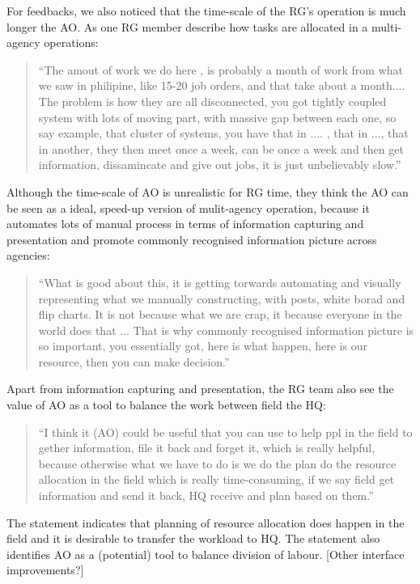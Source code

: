 For feedbacks, we also noticed that the time-scale of the RG's operation is much longer the AO. As one RG member describe how tasks are allocated in a multi-agency operations: 

\begin{quotation}
``The amout of work we do here , is probably a month of work from what we saw in philipine, like 15-20 job orders, and that take about a month.... The problem is how they are all disconnected, you got tightly coupled system with lots of moving part, with massive gap between each one, so say example, that cluster of systems, you have that in .... , that in ..., that in another, they then meet once a week, can be once a week and then get information, dissamincate and give out jobs, it is just unbelievably slow.''
\end{quotation}

Although the time-scale of AO is unrealistic for RG time,  they think the AO can be seen as a ideal, speed-up version of mulit-agency operation, because it automates lots of manual process in terms of information capturing and presentation and promote commonly recognised information picture across agencies:

\begin{quotation}
``What is good about this, it is getting torwards automating and visually representing what we manually constructing, with posts, white borad and flip charts. It is not because what we are crap, it because everyone in the world does that ...  That is why commonly recognised information picture is so important, you essentially got, here is what happen, here is our resource, then you can make decision.''
\end{quotation}

Apart from information capturing and presentation, the RG team also see the value of AO as a tool to balance the work between field the HQ: 

\begin{quotation}
``I think it (AO) could be useful that you can use to help ppl in the field to gether information, file it back and forget it, which is really helpful, because otherwise what we have to do is we do the plan do the resource allocation in the field which is really time-consuming, if we say field get information and send it back, HQ receive and plan based on them.''
\end{quotation}

The statement indicates that planning of resource allocation does happen in the field and it is desirable to transfer the workload to HQ. The statement also identifies AO as a (potential) tool to balance division of labour. 
[Other interface improvements?] 


